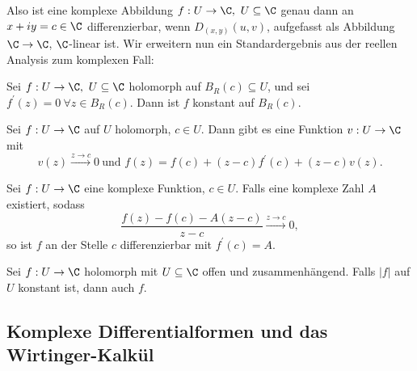 \lecture
		Also ist eine komplexe Abbildung $ f: U \to \C,\ U \subseteq \C $ genau dann an $ x+iy = c \in \C $ differenzierbar, wenn $ D_{(x,y)}(u,v) $, aufgefasst als Abbildung $ \C \to \C $, $\C$-linear ist. Wir erweitern nun ein Standardergebnis aus der reellen Analysis zum komplexen Fall:
		\begin{thm}
			Sei $ f: U \to \C,\ U \subseteq \C $ holomorph auf $ B_R(c) \subseteq U $, und sei $ f^\prime(z) = 0\ \forall z \in B_R(c) $. Dann ist $f$ konstant auf $ B_R(c). $
		\end{thm}
		
		\begin{thmn}
			Sei $ f: U \to \C $ auf $U$ holomorph, $ c \in U $. Dann gibt es eine Funktion $ v: U \to \C $ mit 
			$$ v(z) \overset{z \to c}{\longrightarrow} 0\ \text{und } f(z) = f(c) + (z-c)f^\prime(c) + (z-c) v(z). $$
		\end{thmn}
		
		\begin{thm}
			Sei $ f: U \to \C $ eine komplexe Funktion, $ c \in U $. Falls eine komplexe Zahl $A$ existiert, sodass 
			\[ \frac{f(z) - f(c) - A(z-c)}{z-c} \overset{z \to c}{\longrightarrow} 0, \]
			so ist $f$ an der Stelle $c$ differenzierbar mit $ f^\prime(c) = A. $
		\end{thm}
		
		\begin{thm}
			Sei $ f: U \to \C $ holomorph mit $ U \subseteq \C $ offen und zusammenhängend. Falls $ |f| $ auf $U$ konstant ist, dann auch $f$.
		\end{thm}
	
	
	
	\subsection*{Komplexe Differentialformen und das Wirtinger-Kalkül}
		
